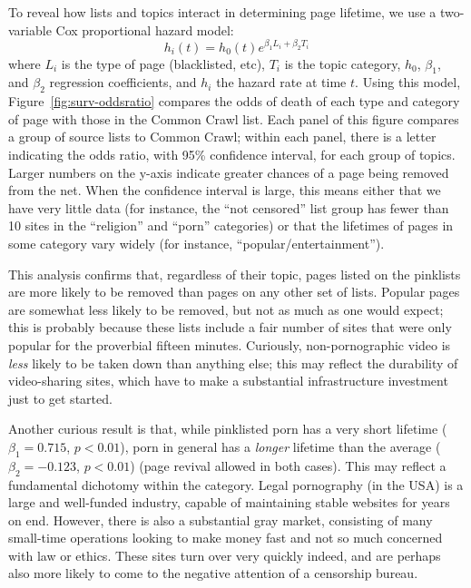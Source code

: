 To reveal how lists and topics interact in determining page lifetime,
we use a two-variable Cox proportional hazard model:
\begin{equation}\label{e:coxph}
h_i(t) = h_0(t)e^{\beta_1L_i + \beta_2 T_i}
\end{equation}
where $L_i$ is the type of page (blacklisted, etc), $T_i$ is the topic
category, $h_0$, $\beta_1$, and $\beta_2$ regression coefficients, and
$h_i$ the hazard rate at time $t$.  Using this model,
Figure~\ref{fig:surv-oddsratio} compares the odds of death of each
type and category of page with those in the Common Crawl list.  Each
panel of this figure compares a group of source lists to Common Crawl;
within each panel, there is a letter indicating the odds ratio, with
95\% confidence interval, for each group of topics.  Larger numbers on
the y-axis indicate greater chances of a page being removed from the
net.  When the confidence interval is large, this means either that we
have very little data (for instance, the “not censored” list group
has fewer than 10 sites in the “religion” and “porn” categories)
or that the lifetimes of pages in some category vary widely (for
instance, “popular/entertainment”).

This analysis confirms that, regardless of their topic, pages listed
on the pinklists are more likely to be removed than pages on any other
set of lists.  Popular pages are somewhat less likely to be removed,
but not as much as one would expect; this is probably because these
lists include a fair number of sites that were only popular for the
proverbial fifteen minutes.  Curiously, non-pornographic video is
\emph{less} likely to be taken down than anything else; this may
reflect the durability of video-sharing sites, which have to make a
substantial infrastructure investment just to get started.

Another curious result is that, while pinklisted porn has a very short
lifetime ($\beta_1 = 0.715$, $p < 0.01$), porn in general has a
\emph{longer} lifetime than the average ($\beta_2 = -0.123$, $p <
0.01$) (page revival allowed in both cases).  This may reflect a
fundamental dichotomy within the category.  Legal pornography (in the
USA) is a large and well-funded industry, capable of maintaining
stable websites for years on end.  However, there is also a
substantial gray market, consisting of many small-time operations
looking to make money fast and not so much concerned with law or
ethics.  These sites turn over very quickly indeed, and are perhaps
also more likely to come to the negative attention of a censorship
bureau.
